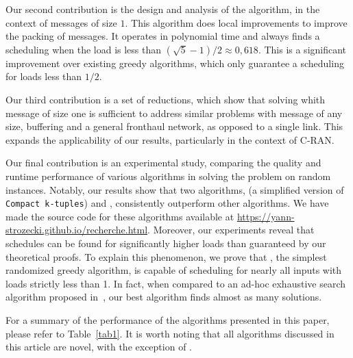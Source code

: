 \documentclass[pdflatex,sn-mathphys,iicol]{sn-jnl}%
\theoremstyle{thmstyleone}%
\theoremstyle{thmstyletwo}%
\theoremstyle{thmstylethree}%
\begin{document}
Our second contribution is the design and analysis of the \swapandmove algorithm, in the context of messages of size $1$. This algorithm does local improvements to improve the packing of messages. It operates in polynomial time and always finds a scheduling when the load is less than $(\sqrt{5}-1)/2 \approx 0,618$. This is a significant improvement over existing greedy algorithms, which only guarantee a scheduling for loads less than $1/2$.

Our third contribution is a set of reductions, which show that solving \pma whith message of size one is sufficient to address similar problems with message of any size, buffering and a general fronthaul network, as opposed to a single link. This expands the applicability of our results, particularly in the context of C-RAN.

Our final contribution is an experimental study, comparing the quality and runtime performance of various algorithms in solving the \pma problem on random instances. Notably, our results show that two algorithms, \compactfit (a simplified version of \texttt{Compact k-tuples}) and \swapandmove, consistently outperform other algorithms. We have made the source code for these algorithms available at \url{https://yann-strozecki.github.io/recherche.html}. Moreover, our experiments reveal that schedules can be found for significantly higher loads than guaranteed by our theoretical proofs. To explain this phenomenon, we prove that \greedyuniform, the simplest randomized greedy algorithm, is capable of scheduling for nearly all inputs with loads strictly less than 1.  In fact, when compared to an ad-hoc exhaustive search algorithm proposed in~\cite{bartharxiv2018deterministic}, our best algorithm finds almost as many solutions.


For a summary of the performance of the algorithms presented in this paper, please refer to Table~\ref{tab1}. It is worth noting that all algorithms discussed in this article are novel, with the exception of \metaoffset.
\end{document}
